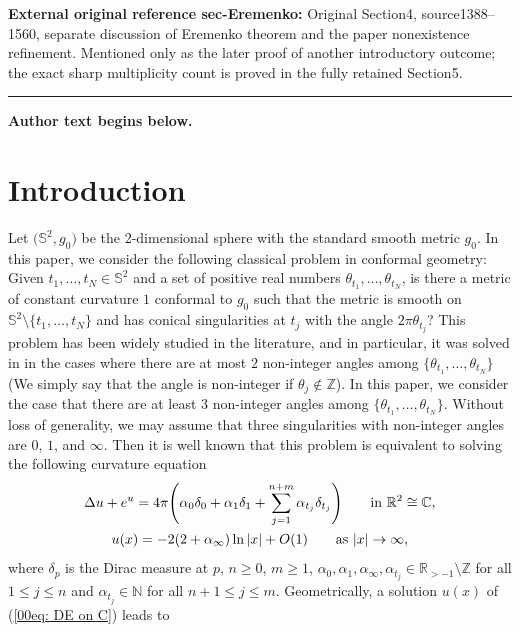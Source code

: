\documentclass[11pt]{article}
\numberwithin{equation}{section}
\numberwithin{equation}{section}
\def\C{\mathbb C}
\def\R{\mathbb R}
\begin{document}
\noindent\textbf{External original reference sec-Eremenko:} Original Section4, source1388–1560, separate discussion of Eremenko theorem and the paper nonexistence refinement. Mentioned only as the later proof of another introductory outcome; the exact sharp multiplicity count is proved in the fully retained Section5.\par
\medskip\hrule\medskip\noindent\textbf{Author text begins below.}\par

\section{Introduction}

Let $\bigl(\mathbb{S}^2,g_0\bigr)$ be the $2$-dimensional
sphere with the standard smooth metric $g_0$.
In this paper, we consider the following classical problem in conformal geometry:
Given $t_1,\dots,t_N\in \mathbb{S}^2$ and a set
of positive real numbers $\theta_{t_1},\dots,\theta_{t_N}$, is there
 a metric of constant curvature $1$ conformal to $g_0$
such that the
metric is smooth on $\mathbb{S}^2\setminus\{t_1,\dots,t_N\}$ and has conical
singularities at $t_j$ with the angle $2\pi\theta_{t_j}$? This problem has been widely studied in the literature, and in particular, it
was solved in \cite{Eremenko,Coaxial,EGT} in the cases where there are at
most $2$ non-integer angles among
$\{\theta_{t_1},\dots,\theta_{t_N}\}$ \big(We simply say that the angle
is non-integer if $\theta_j\notin\mathbb{Z}$\big). In this paper, we
consider the case that there are at least $3$ non-integer angles among
$\{\theta_{t_1},\dots,\theta_{t_N}\}$. Without loss of generality, we
may assume that three singularities with non-integer angles are $0$,
$1$, and $\infty$.
Then it is well known that this problem is equivalent to solving
 the following curvature
equation
\begin{gather}
 \Delta u+{\rm e}^u=4\pi\Biggl(\alpha_0\delta_{0}+\alpha_1\delta_{1}
 +\sum_{j=1}^{n+m}\alpha_{t_j}\delta_{t_j}\Biggr)
 \qquad \text{in }\mathbb R^2\cong\C,\nonumber \\
 u(x)=-2(2+\alpha_\infty)\ln|x|+O(1) \qquad \text{as }|x|\to\infty, \label{00eq: DE on C}
 \end{gather}
where $\delta_p$ is the Dirac measure at $p$, $n\geq 0$, $m\geq 1$, $\alpha_0, \alpha_1, \alpha_\infty,
\alpha_{t_j}\in\R_{>-1}\setminus\mathbb{Z}$ for all $1\leq j\leq n$
and $\alpha_{t_j}\in\mathbb{N}$ for all $n+1\leq j\leq
m$. Geometrically, a solution $u(x)$ of (\ref{00eq: DE on C}) leads to
\end{document}

